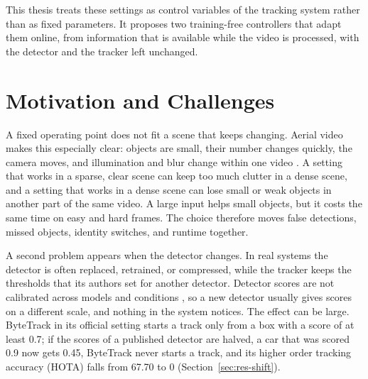 This thesis treats these settings as control variables of the tracking system rather than as fixed parameters. It proposes two training-free controllers that adapt them online, from information that is available while the video is processed, with the detector and the tracker left unchanged.

\section{Motivation and Challenges}\label{sec:intro-motivation}
A fixed operating point does not fit a scene that keeps changing. Aerial video makes this especially clear: objects are small, their number changes quickly, the camera moves, and illumination and blur change within one video \cite{zhu2022visdrone,du2018uavdt,cheng2023smallobject}. A setting that works in a sparse, clear scene can keep too much clutter in a dense scene, and a setting that works in a dense scene can lose small or weak objects in another part of the same video. A large input helps small objects, but it costs the same time on easy and hard frames. The choice therefore moves false detections, missed objects, identity switches, and runtime together.

A second problem appears when the detector changes. In real systems the detector is often replaced, retrained, or compressed, while the tracker keeps the thresholds that its authors set for another detector. Detector scores are not calibrated across models and conditions \cite{kuppers2020detcalib}, so a new detector usually gives scores on a different scale, and nothing in the system notices. The effect can be large. ByteTrack in its official setting starts a track only from a box with a score of at least 0.7; if the scores of a published detector are halved, a car that was scored 0.9 now gets 0.45, ByteTrack never starts a track, and its higher order tracking accuracy (HOTA) \cite{luiten2021hota} falls from 67.70 to 0 (Section~\ref{sec:res-shift}).

